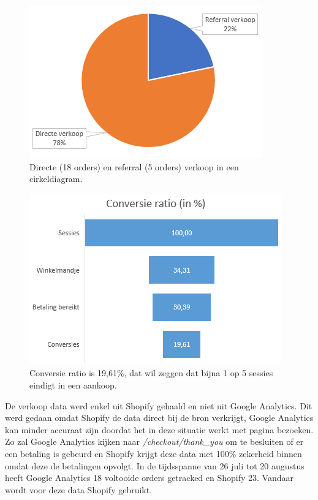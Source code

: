 \begin{figure}
	\includegraphics[scale=0.9]{img/directe-referral-verkoop.png}
	\centering
	\caption{Directe (18 orders) en referral (5 orders) verkoop in een cirkeldiagram.}
	\label{fig:directe-referral-verkoop}
\end{figure}

\begin{figure}
	\includegraphics[scale=0.9]{img/conversie-ratio-trechter.png}
	\centering
	\caption{Conversie ratio is 19,61\%, dat wil zeggen dat bijna 1 op 5 sessies eindigt in een aankoop.}
	\label{fig:conversie-ratio-trechter}
\end{figure}

De verkoop data werd enkel uit Shopify gehaald en niet uit Google Analytics. Dit werd gedaan omdat Shopify de data direct bij de bron verkrijgt, Google Analytics kan minder accuraat zijn doordat het in deze situatie werkt met pagina bezoeken. Zo zal Google Analytics kijken naar \emph{/checkout/thank\_you} om te besluiten of er een betaling is gebeurd en Shopify krijgt deze data met 100\% zekerheid binnen omdat deze de betalingen opvolgt. In de tijdsspanne van 26 juli tot 20 augustus heeft Google Analytics 18 voltooide orders getracked en Shopify 23. Vandaar wordt voor deze data Shopify gebruikt.

